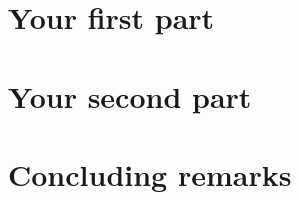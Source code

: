 \section{Your first part}
\label{sec:part1}


\section{Your second part}




\section{Concluding remarks}


